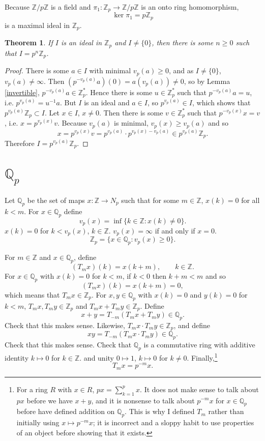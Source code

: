 \documentclass{article}
\newtheorem{theorem}{Theorem}
\theoremstyle{definition}
\begin{document}
Because $\mathbb{Z}/p\mathbb{Z}$ is a field and $\pi_1:\mathbb{Z}_p \to \mathbb{Z}/p\mathbb{Z}$ is an onto ring homomorphism,
\[
\ker \pi_1 = p\mathbb{Z}_p
\]
is a maximal ideal in $\mathbb{Z}_p$.



\begin{theorem}
If $I$ is an ideal in $\mathbb{Z}_p$ and $I \neq \{0\}$, then
there is some $n \geq 0$ such that $I=p^n \mathbb{Z}_p$.
\end{theorem}
\begin{proof}
There is some $a \in I$ with minimal $v_p(a) \geq 0$, and as $I \neq \{0\}$, $v_p(a) \neq \infty$. 
Then $(p^{-v_p(a)}a)(0) = a(v_p(a)) \neq 0$, so by Lemma \ref{invertible},
$p^{-v_p(a)} a \in \mathbb{Z}_p^*$. Hence there is some $u \in \mathbb{Z}_p^*$ such that
$p^{-v_p(a)} a = u$, i.e. $p^{v_p(a)} = u^{-1} a$. But $I$ is an ideal and $a \in I$, so
$p^{v_p(a)} \in I$, which shows that $p^{v_p(a)} \mathbb{Z}_p \subset I$. 
Let $x \in I$, $x \neq 0$.
Then there is some $v \in \mathbb{Z}_p^*$ such that $p^{-v_p(x)}x=v$, i.e.
$x = p^{v_p(x)}v$.  
Because $v_p(a)$ is minimal, $v_p(x) \geq v_p(a)$ and so
\[
x = p^{v_p(x)} v = p^{v_p(a)} \cdot p^{v_p(x)-v_p(a)} \in p^{v_p(a)} \mathbb{Z}_p.
\]
Therefore $I = p^{v_p(a)} \mathbb{Z}_p$.
\end{proof}



\section{$\mathbb{Q}_p$}
Let $\mathbb{Q}_p$ be the set of maps $x:\mathbb{Z} \to N_p$ such that for some $m \in \mathbb{Z}$, 
$x(k)=0$ for all $k<m$. For $x \in \mathbb{Q}_p$ define
\[
v_p(x) = \inf\{k \in \mathbb{Z} : x(k) \neq 0\}. 
\]
$x(k)=0$ for $k<v_p(x)$, $k \in \mathbb{Z}$. $v_p(x) = \infty$ if and only if $x=0$.
\[
\mathbb{Z}_p = \{x \in \mathbb{Q}_p: v_p(x) \geq 0\}.
\]

For $m \in \mathbb{Z}$ and $x \in \mathbb{Q}_p$, define 
\[
(T_m x)(k) = x(k+m),\qquad k \in \mathbb{Z}.
\]
For  $x \in \mathbb{Q}_p$ with $x(k)=0$ for $k<m$,
if $k<0$ then $k+m<m$ and so 
\[
(T_m x)(k) = x(k+m) = 0,
\]
which means that $T_m x \in \mathbb{Z}_p$.
For $x,y \in \mathbb{Q}_p$ with
$x(k)=0$ and $y(k)=0$ for $k<m$,
$T_m x, T_m y \in \mathbb{Z}_p$ and 
$T_m x + T_m y \in \mathbb{Z}_p$. Define
\[
x+y = T_{-m}(T_m x + T_m y) \in \mathbb{Q}_p.
\]
Check that this makes sense.
Likewise, $T_m x \cdot T_m y \in \mathbb{Z}_p$, and define
\[
xy = T_{-m} (T_m x  \cdot T_m y) \in \mathbb{Q}_p.
\]
Check that this makes sense.
Check that $\mathbb{Q}_p$ is a commutative ring with 
additive identity $k \mapsto 0$ for $k \in \mathbb{Z}$.
and unity $0 \mapsto 1$, $k \mapsto 0$ for $k \neq 0$. Finally,\footnote{For a ring $R$ with $x \in R$, $px = \sum_{k=1}^p x$. It does not make
sense to talk about $px$ before we have $x+y$, and  it is nonsense to talk about $p^{-m}x$ for $x \in \mathbb{Q}_p$ before have
defined addition on $\mathbb{Q}_p$. This is why I defined $T_m$ rather than initially using $x \mapsto p^{-m}x$; it is incorrect and a sloppy
habit to use properties of an object before showing that it exists.}
\[
T_m x = p^{-m}x.
\]
\end{document}
